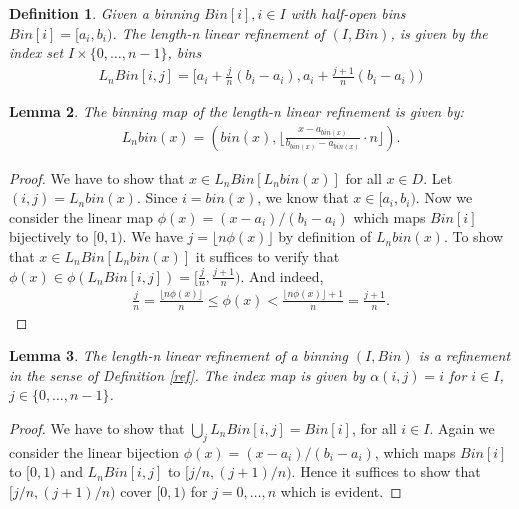 \documentclass{article}
\theoremstyle{plain}
\newtheorem{definition}{Definition}[section]
\newtheorem{lemma}[definition]{Lemma}
\theoremstyle{remark}
\newcommand{\Union}{\bigcup}
\newcommand{\floor}[1]{\lfloor#1\rfloor}
\begin{document}
\begin{definition}
  Given a binning $Bin[i], i\in I$ with half-open bins $Bin[i] = [a_i, b_i)$.
  The length-n linear refinement of $(I, Bin)$, is given by the index set $I \times \{0,\dots, n-1\}$,
  bins
  \begin{align}\label{eq:lref}
    L_nBin[i,j] = [ a_i + \frac{j}{n}(b_i - a_i), a_i + \frac{j+1}{n}(b_i - a_i) )
  \end{align}
\end{definition}

\begin{lemma}
  The binning map of the length-n linear refinement is given by:
  \begin{align}\label{eq:lrefmap}
    L_nbin(x) = ( bin(x), \floor{\frac{x - a_{bin(x)}}{b_{bin(x)} - a_{bin(x)}} \cdot n } ).
  \end{align}
\end{lemma}

\begin{proof}
  We have to show that $x \in L_nBin[ L_nbin(x) ]$ for all $x \in D$.
  Let $(i,j) = L_nbin(x)$.
  Since $i = bin(x)$, we know that $x \in [a_i, b_i)$.
  Now we consider the linear map $\phi(x) = (x-a_i)/(b_i-a_i)$ which maps $Bin[i]$ bijectively to $[0,1)$.
  We have $j = \floor{ n \phi(x) }$ by definition of $L_nbin(x)$.
  To show that $x \in L_nBin[ L_nbin(x) ]$ it suffices to verify
  that $\phi(x) \in \phi(L_nBin[i,j]) = [ \frac{j}{n}, \frac{j+1}{n} )$.
  And indeed,
  \begin{align*}
    \frac{j}{n} = \frac{\floor{ n \phi(x) }}{n} \leq \phi(x) <
    \frac{\floor{ n \phi(x) } + 1 }{n} =  \frac{j+1}{n}.
  \end{align*}
\end{proof}

\begin{lemma}
  The length-n linear refinement of a binning $(I, Bin)$ is a refinement in the sense of Definition \ref{ref}.
  The index map is given by $\alpha(i,j) = i$ for $i \in I$, $j \in \{0,\dots,n-1\}$.
\end{lemma}

\begin{proof}
  We have to show that $\Union_{j} L_nBin[i,j] = Bin[i]$, for all $i \in I$.
  Again we consider the linear bijection $\phi(x) = (x-a_i)/(b_i-a_i)$, which maps $Bin[i]$ to $[0,1)$ and $L_nBin[i,j]$ to $[j/n, (j+1)/n)$.
  Hence it suffices to show that $[j/n, (j+1)/n)$ cover $[0,1)$ for $j=0,\dots,n$ which is evident.
\end{proof}
\end{document}
